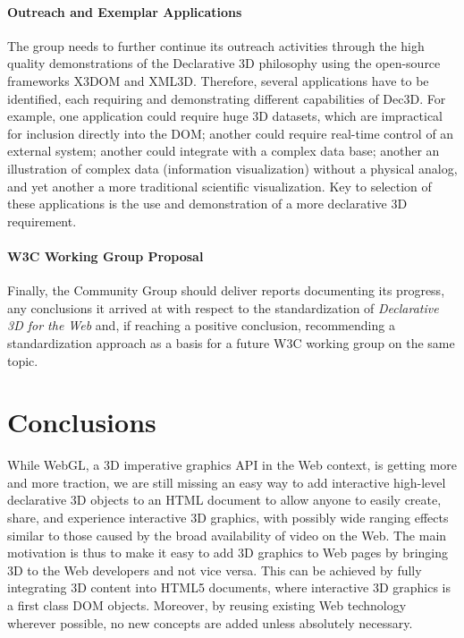\documentclass{acmsiggraph}
\begin{document}
\paragraph{Outreach and Exemplar Applications}
The group needs to further continue its outreach activities through the high quality demonstrations of the Declarative 3D philosophy using the open-source frameworks X3DOM and XML3D. Therefore, several applications have to be identified, each requiring and demonstrating different capabilities of Dec3D. For example, one application could require huge 3D datasets, which are impractical for inclusion directly into the DOM; another could require real-time control of an external system; another could integrate with a complex data base; another an illustration of complex data (information visualization) without a physical analog, and yet another a more traditional scientific visualization. Key to selection of these applications is the use and demonstration of a more declarative 3D requirement.

\paragraph{W3C Working Group Proposal}
Finally, the Community Group should deliver reports documenting its progress, any conclusions it arrived at with respect to the standardization of \textit{Declarative 3D for the Web} and, if reaching a positive conclusion, recommending a standardization approach as a basis for a future W3C working group on the same topic.


\section{Conclusions}
\label{sec:Conclusions}

While WebGL, a 3D imperative graphics API in the Web context, is getting more and more traction, we are still missing an easy way to add interactive high-level declarative 3D objects to an HTML document to allow anyone to easily create, share, and experience interactive 3D graphics, with possibly wide ranging effects similar to those caused by the broad availability of video on the Web.
The main motivation is thus to make it easy to add 3D graphics to Web pages by bringing 3D to the Web developers and not vice versa. This can be achieved by fully integrating 3D content into HTML5 documents, where interactive 3D graphics is a first class DOM objects. Moreover, by reusing existing Web technology wherever possible, no new concepts are added unless absolutely necessary.
\end{document}
